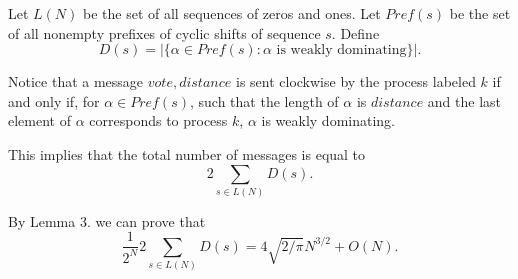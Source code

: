 \documentclass[a4paper,12pt]{article}
\begin{document}
Let $L(N)$ be the set of all sequences of zeros and ones. Let $Pref(s)$ be the set of all nonempty prefixes of cyclic shifts of sequence $s$. Define
$$D(s) = |\{\alpha \in Pref(s) : \alpha \textrm{ is weakly dominating}\}|.$$

Notice that a message $vote, distance$ is sent clockwise by the process labeled $k$ if and only if, for $\alpha \in Pref(s)$, such that the length of $\alpha$ is $distance$ and the last element of $\alpha$ corresponds to process $k$, $\alpha$ is weakly dominating.

This implies that the total number of messages is equal to 
$$2\sum_{s\in L(N)} D(s).$$

By Lemma 3. we can prove that
$$\frac{1}{2^N} 2 \sum_{s\in L(N)} D(s) = 4\sqrt{2/\pi} N^{3/2} + O(N).$$

\printbibliography
\end{document}
